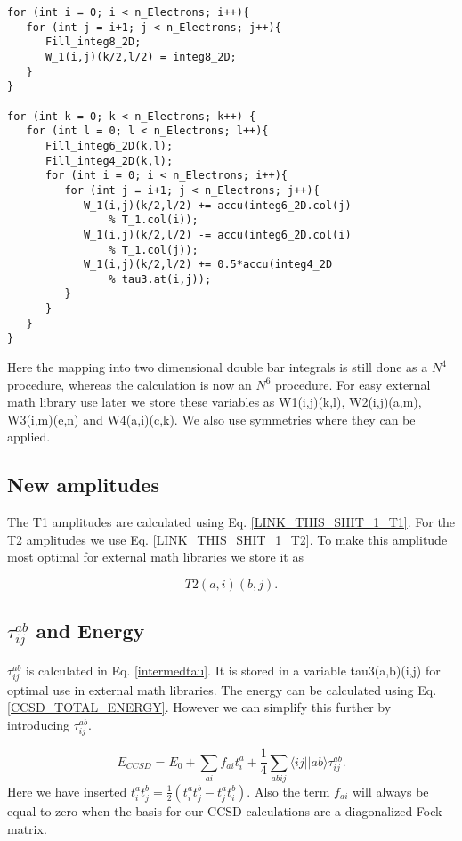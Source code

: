 \begin{lstlisting}
for (int i = 0; i < n_Electrons; i++){
   for (int j = i+1; j < n_Electrons; j++){
      Fill_integ8_2D;
      W_1(i,j)(k/2,l/2) = integ8_2D;
   }
}

for (int k = 0; k < n_Electrons; k++) {
   for (int l = 0; l < n_Electrons; l++){      
      Fill_integ6_2D(k,l);
      Fill_integ4_2D(k,l);
      for (int i = 0; i < n_Electrons; i++){
         for (int j = i+1; j < n_Electrons; j++){
            W_1(i,j)(k/2,l/2) += accu(integ6_2D.col(j)
                % T_1.col(i));
            W_1(i,j)(k/2,l/2) -= accu(integ6_2D.col(i)
                % T_1.col(j));
            W_1(i,j)(k/2,l/2) += 0.5*accu(integ4_2D
                % tau3.at(i,j));
         }
      }
   }
}
\end{lstlisting}

Here the mapping into two dimensional double bar integrals is still done as a $N^4$ procedure, whereas the calculation is now an $N^6$ procedure. For easy external math library use later we store these variables as W1(i,j)(k,l), W2(i,j)(a,m), W3(i,m)(e,n) and W4(a,i)(c,k). We also use symmetries where they can be applied.

\subsection{New amplitudes}
The T1 amplitudes are calculated using Eq. \eqref{LINK_THIS_SHIT_1_T1}. For the T2 amplitudes we use Eq. \eqref{LINK_THIS_SHIT_1_T2}. To make this amplitude most optimal for external math libraries we store it as

\begin{equation}
T2(a,i)(b,j) . \label{howtostoret2}
\end{equation}

\subsection{$\tau_{ij}^{ab}$ and Energy}
$\tau_{ij}^{ab}$ is calculated in Eq. \eqref{intermedtau}. It is stored in a variable tau3(a,b)(i,j) for optimal use in external math libraries. The energy can be calculated using Eq. \eqref{CCSD_TOTAL_ENERGY}. However we can simplify this further by introducing $\tau_{ij}^{ab}$.

\begin{equation}
E_{CCSD} = E_0 + \sum_{ai} f_{ai} t_i^a + \frac{1}{4} \sum_{abij} \langle ij || ab \rangle \tau_{ij}^{ab} .
\end{equation}
Here we have inserted $t_i^a t_j^b = \frac{1}{2} \left( t_i^a t_j^b - t_j^a t_i^b \right)$. Also the term $f_{ai}$ will always be equal to zero when the basis for our CCSD calculations are a diagonalized Fock matrix.

